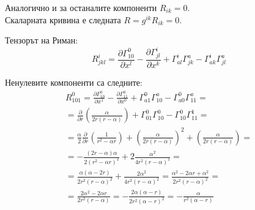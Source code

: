 \documentclass[a4paper,12pt]{article}
\begin{document}
    Аналогично и за останалите компоненти $R_{ik}=0$.\\
    Скаларната кривина е следната $R=g^{ik}R_{ik}=0$.

    Тензорът на Риман: 
    \begin{equation*}
        R^i_{jkl}=\frac{\partial\varGamma^0_{10}}{\partial x^l} - \frac{\partial \varGamma^i_{jl}}{\partial x^k} + \varGamma^i_{al}\varGamma^a_{jk}-\varGamma^i_{ak}\varGamma^a_{jl}
    \end{equation*}

    Ненулевите компоненти са следните: 
    \begin{equation*}
        \begin{aligned}
            R^0_{101} = \frac{\partial \varGamma^0_{10}}{\partial x^1} - \frac{\partial\varGamma^0_{11}}{\partial x^0}+ \varGamma^0_{a1}\varGamma^a_{10}
            - \varGamma^0_{a0}\varGamma^a_{11}= \\
            = \frac{\partial}{\partial r} \left( \frac{\alpha}{2r(r-\alpha)} \right)
            + \varGamma^0_{01}\varGamma^0_{10} - \varGamma^0_{10}\varGamma^1_{11} =\\
            = \frac{\alpha}{2}\frac{\partial}{\partial r}\left( \frac{1}{r^2-\alpha r} \right) + \left( \frac{\alpha}{2r(r-\alpha)} \right)^2 + \left( \frac{\alpha}{2r(r-\alpha)} \right)= \\
            = - \frac{(2r-\alpha)\alpha}{2(r^2-\alpha r)^2} + 2\frac{\alpha^2}{4r^2(r-\alpha)^2} = \\
            = \frac{\alpha(\alpha - 2r)}{2r^2(r-\alpha)^2} + \frac{2\alpha^2}{4r^2(r-\alpha)^2} = \frac{\alpha^2-2\alpha r + \alpha^2}{2r^2(r-\alpha)^2}= \\
            = \frac{2\alpha^2-2\alpha r}{2r^2(r-\alpha)} = -\frac{2\alpha(\alpha-r)}{2r^2(\alpha-r)^2} = - \frac{\alpha}{r^2(\alpha - r)}
        \end{aligned}
    \end{equation*}
\end{document}
